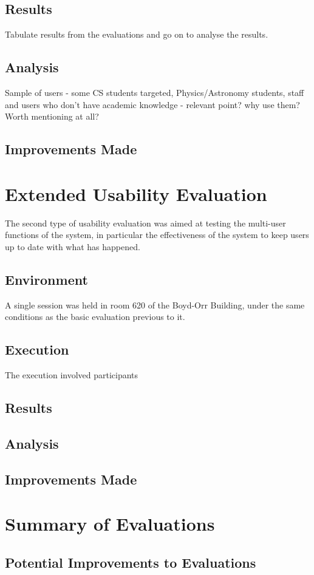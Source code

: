 \subsection{Results}
Tabulate results from the evaluations and go on to analyse the results.

\subsection{Analysis}
Sample of users - some CS students targeted, Physics/Astronomy students, staff and users who don't have academic knowledge - relevant point? why use them? Worth mentioning at all?

\subsection{Improvements Made}

\section{Extended Usability Evaluation}
The second type of usability evaluation was aimed at testing the multi-user functions of the system, in particular the effectiveness of the system to keep users up to date with what has happened. 

\subsection{Environment}
A single session was held in room 620 of the Boyd-Orr Building, under the same conditions as the basic evaluation previous to it.

\subsection{Execution}
The execution involved participants

\subsection{Results}
\subsection{Analysis}

\subsection{Improvements Made}

\section{Summary of Evaluations}

\subsection{Potential Improvements to Evaluations}
